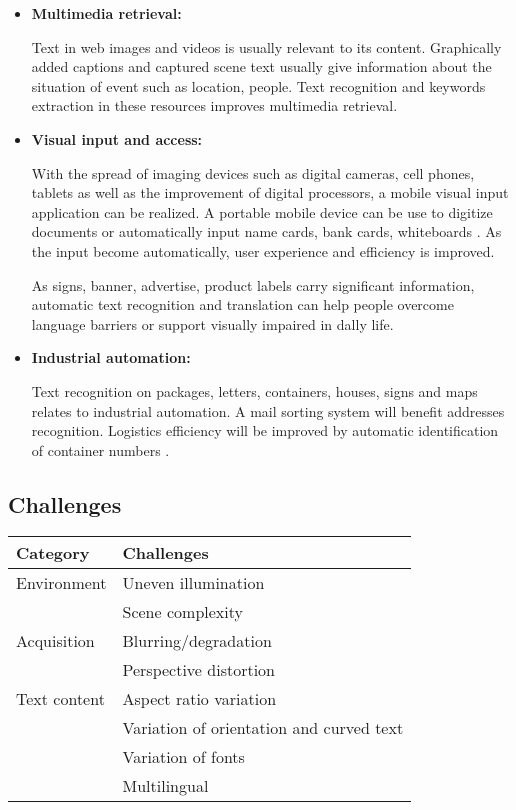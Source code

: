 \begin{itemize}
\item{\textbf{Multimedia retrieval:}}

Text in web images and videos is usually relevant to its content. Graphically added captions and captured scene text usually give information about the situation of event such as location, people. Text recognition and keywords extraction in these resources improves multimedia retrieval. 
\item{\textbf{Visual input and access:}}

With the spread of imaging devices such as digital cameras, cell phones, tablets as well as the improvement of digital processors, a mobile visual input application can be realized. A portable mobile device can be use to digitize documents or automatically input name cards, bank cards, whiteboards \cite{}. As the input become automatically, user experience and efficiency is improved. 

As signs, banner, advertise, product labels carry significant information, automatic text recognition and translation can help people overcome language barriers or support visually impaired in dally life. 

\item{\textbf{Industrial automation:}}

Text recognition on packages, letters, containers, houses, signs and maps relates to industrial automation. A mail sorting system will benefit addresses recognition. Logistics efficiency will be improved by automatic identification of container numbers \cite{39}.

\end{itemize}

\subsection{Challenges}
\begin{center} \label{Chalenges}
\begin{tabular}{|l|l|}
\hline 
\textbf{Category} &\textbf{Challenges} \\ 
\hline 
Environment &Uneven illumination \\ 
	\cline{2-2} 
 	&Scene complexity \\ 
\hline 
Acquisition &Blurring/degradation \\ 
	\cline{2-2} 
	 &Perspective distortion \\ 
\hline 
Text content &Aspect ratio variation \\ 
	\cline{2-2} 
 	&Variation of orientation and curved text \\ 
	\cline{2-2}  
	 &Variation of fonts \\ 
	\cline{2-2} 
 	&Multilingual\\ 
\hline 
\end{tabular} 
\end{center}
